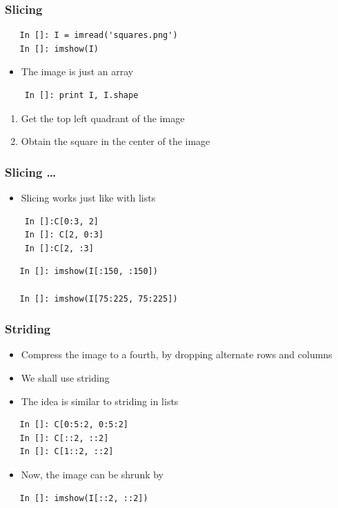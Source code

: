 \begin{frame}[fragile]
  \frametitle{Slicing}
  \begin{lstlisting}
   In []: I = imread('squares.png')
   In []: imshow(I)
  \end{lstlisting}
  \begin{itemize}
  \item The image is just an array
  \end{itemize}
  \begin{lstlisting}
    In []: print I, I.shape
  \end{lstlisting}
  \begin{enumerate}
  \item Get the top left quadrant of the image
  \item Obtain the square in the center of the image
  \end{enumerate}
\end{frame}

\begin{frame}[fragile]
  \frametitle{Slicing \ldots}
  \begin{itemize}
  \item Slicing works just like with lists
  \end{itemize}
  \begin{lstlisting}
    In []:C[0:3, 2]
    In []: C[2, 0:3]
    In []:C[2, :3]
  \end{lstlisting}
  \begin{lstlisting}
   In []: imshow(I[:150, :150])

   In []: imshow(I[75:225, 75:225])
  \end{lstlisting}
\end{frame}

\begin{frame}[fragile]
  \frametitle{Striding}
  \begin{itemize}
  \item Compress the image to a fourth, by dropping alternate rows and
    columns
  \item We shall use striding
  \item The idea is similar to striding in lists
  \end{itemize}
  \begin{lstlisting}
   In []: C[0:5:2, 0:5:2]
   In []: C[::2, ::2]
   In []: C[1::2, ::2]
  \end{lstlisting}
  \begin{itemize}
  \item Now, the image can be shrunk by
  \end{itemize}
  \begin{lstlisting}
   In []: imshow(I[::2, ::2])
  \end{lstlisting}
\end{frame}

